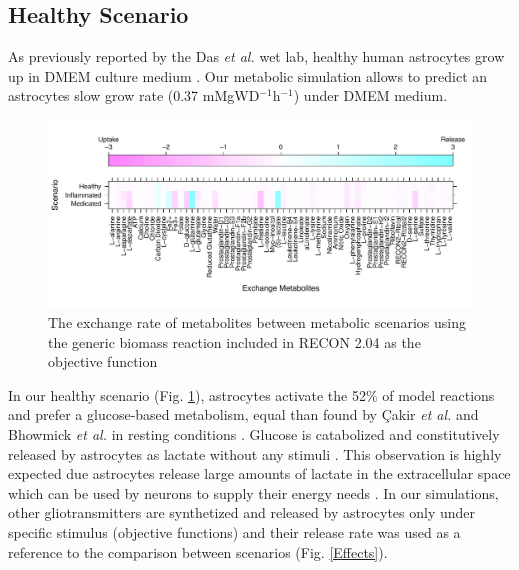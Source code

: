 \subsection*{Healthy Scenario}
As previously reported by the Das \emph{et al.} wet lab, healthy human astrocytes grow up in DMEM culture medium \cite{Das2010}. Our metabolic simulation allows to predict an astrocytes slow grow rate  (0.37 mMgWD$^{-1}$h$^{-1}$) under DMEM medium.

\begin{figure}[h]
\begin{center}
\includegraphics[width=\textwidth]{neuroprotective/Exchanges}
\end{center}
\caption{The exchange rate of metabolites between metabolic scenarios using the generic biomass reaction included in RECON 2.04 as the objective function}
\label{Exchanges}
\end{figure}

In our healthy scenario (Fig. \ref{Exchanges}), astrocytes activate the 52\% of model reactions and prefer a glucose-based metabolism, equal than found by Çakir \emph{et al.} and Bhowmick \emph{et al.} in resting conditions \cite{Cakir2007,Bhowmick2015}. Glucose is catabolized and constitutively released by astrocytes as lactate without any stimuli \cite{LeFoll2016}. This observation is highly expected due astrocytes release large amounts of lactate in the extracellular space which can be used by neurons to supply their energy needs \cite{Allaman2011}.  In our simulations, other gliotransmitters are synthetized and released by astrocytes only under specific stimulus (objective functions) and their release rate was used as a reference to the comparison between scenarios (Fig. \ref{Effects}).

